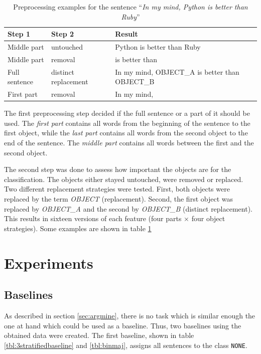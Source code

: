 \begin{table}[ht]
\centering

\caption{Preprocessing examples for the sentence \enquote{\emph{In my mind, Python is better than Ruby}}}
\label{preprocessing_example}
\begin{tabularx}{\linewidth}{llX}
\toprule
Step 1 & Step 2 & Result \\ \midrule
Middle part & untouched & Python is better than Ruby \\
Middle part & removal & is better than \\
Full sentence & distinct replacement &In my mind, OBJECT\_A is better than OBJECT\_B \\
First part & removal & In my mind, \\
\bottomrule
\end{tabularx}

\end{table}

The first preprocessing step decided if the full sentence or a part of it should be used. The \emph{first part} contains all words from the beginning of the sentence to the first object, while the \emph{last part} contains all words from the second object to the end of the sentence. The \emph{middle part} contains all words between the first and the second object.

The second step was done to assess how important the objects are for the classification. The objects either stayed untouched, were removed or replaced. Two different replacement strategies were tested. First, both objects were replaced by the term \emph{OBJECT} (replacement). Second, the first object was replaced by \emph{OBJECT\_A} and the second by \emph{OBJECT\_B} (distinct replacement). This results in sixteen versions of each feature (four parts $\times$ four object strategies). Some examples are shown in table \ref{preprocessing_example}





\section{Experiments}
\subsection{Baselines}
\label{sec:3_baseline}
As described in section \ref{sec:argmine}, there is no task which is similar enough the one at hand which could be used as a baseline. Thus, two baselines using the obtained data were created. The first baseline, shown in table \ref{tbl:3stratifiedbaseline} and \ref{tbl:binmaj}, assigns all sentences to the class \texttt{NONE}.

